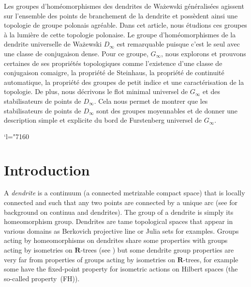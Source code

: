 \documentclass[JEP,XML,SOM,Unicode,NoFloatCountersInSection]{cedram}
\newcommand{\Changel}{\mathcode`l="7160}
\theoremstyle{plain}
\theoremstyle{definition}
\newcommand{\RR}{\mathbf{R}}
\begin{document}
\begin{altabstract}
Les groupes d’homéomorphismes des dendrites de Wa\.zewski généralisées agissent sur l’ensemble des points de branchement de la dendrite et possèdent ainsi une topologie de groupe polonais agréable. Dans cet article, nous étudions ces groupes à la lumière de cette topologie polonaise. Le groupe d’homéomorphismes de la dendrite universelle de Wa\.zewski $D_\infty$ est remarquable puisque c’est le seul avec une classe de conjugaison dense. Pour ce groupe, $G_\infty$, nous explorons et prouvons certaines de ses propriétés topologiques comme l’existence d’une classe de conjugaison comaigre, la propriété de Steinhaus, la propriété de continuité automatique, la propriété des groupes de petit indice et une caractérisation de la topologie. De plus, nous décrivons le flot minimal universel de $G_\infty$ et des stabilisateurs de points de $D_\infty$. Cela nous permet de montrer que les stabilisateurs de points de $D_\infty$ sont des groupes moyennables et de donner une description simple et explicite du bord de Furstenberg universel de $G_\infty$.
\end{altabstract}

\maketitle
\tableofcontents
\mainmatter
\Changel

\section{Introduction}
A \emph{dendrite} is a continuum (\ie a connected metrizable compact space) that is locally connected and such that any two points are connected by a unique arc (see \cite{Nadler} for background on continua and dendrites). The group of a dendrite is simply its homeomorphism group. Dendrites are tame topological spaces that appear in various domains as Berkovich projective line or Julia sets for examples. Groups acting by homeomorphisms on dendrites share some properties with groups acting by isometries on $\RR$-trees (see \eg \cite{DM_dendrites}) but some dendrite group properties are very far from properties of groups acting by isometries on $\RR$-trees, for example some have the fixed-point property for isometric actions on Hilbert spaces (the so-called property~(FH)).
\end{document}
